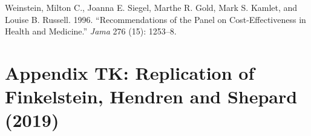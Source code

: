 \documentclass[
  10pt,
]{article}
\begin{document}
\leavevmode\hypertarget{ref-weinsteinRecommendationsPanelCosteffectiveness1996}{}%
Weinstein, Milton C., Joanna E. Siegel, Marthe R. Gold, Mark S. Kamlet,
and Louise B. Russell. 1996. ``Recommendations of the Panel on
Cost-Effectiveness in Health and Medicine.'' \emph{Jama} 276 (15):
1253--8.

\newpage

\hypertarget{appendix-tk-replication-of-finkelstein-hendren-and-shepard-2019}{%
\section*{Appendix TK: Replication of Finkelstein, Hendren and Shepard
(2019)}\label{appendix-tk-replication-of-finkelstein-hendren-and-shepard-2019}}
\end{document}

